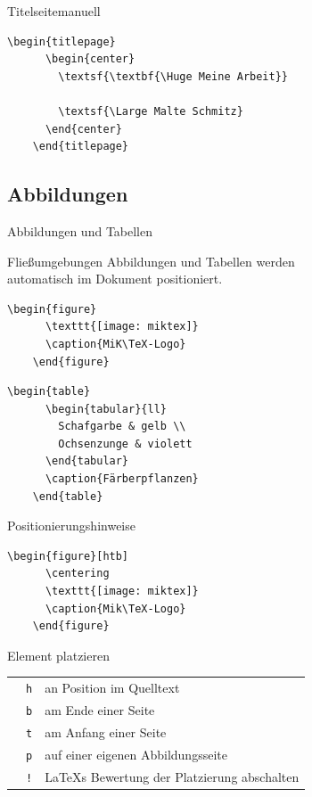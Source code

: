 \begin{Frame}[fragile]{Titelseite}{manuell}
  \begin{lstlisting}[gobble=4]
    \begin{titlepage}
      \begin{center}
        \textsf{\textbf{\Huge Meine Arbeit}}

        \textsf{\Large Malte Schmitz}
      \end{center}
    \end{titlepage}
  \end{lstlisting}
\end{Frame}

\subsection{Abbildungen}

\begin{Frame}[fragile]{Abbildungen und Tabellen}
  \begin{Block}{Fließumgebungen}
    Abbildungen und Tabellen werden\\
    automatisch im Dokument positioniert.
  \end{Block}

  \begin{lstlisting}[gobble=4]
    \begin{figure}
      \texttt{[image: miktex]}
      \caption{MiK\TeX-Logo}
    \end{figure}
  \end{lstlisting}

  \begin{lstlisting}[gobble=4]
    \begin{table}
      \begin{tabular}{ll}
        Schafgarbe & gelb \\
        Ochsenzunge & violett
      \end{tabular}
      \caption{Färberpflanzen}
    \end{table}
  \end{lstlisting}
\end{Frame}

\begin{Frame}[fragile]{Positionierungshinweise}
  \begin{lstlisting}[gobble=4]
    \begin{figure}[htb]
      \centering
      \texttt{[image: miktex]}
      \caption{Mik\TeX-Logo}
    \end{figure}
  \end{lstlisting}

  \xxx

  Element platzieren
  \begin{tabular}{lr@{ }l}
    & \lstinline-h- & an Position im Quelltext \\
    & \lstinline-b- & am Ende einer Seite \\
    & \lstinline-t- & am Anfang einer Seite \\
    & \lstinline-p- & auf einer eigenen Abbildungsseite \\
    & \lstinline-!- & \LaTeX s Bewertung der Platzierung abschalten
  \end{tabular}
\end{Frame}

